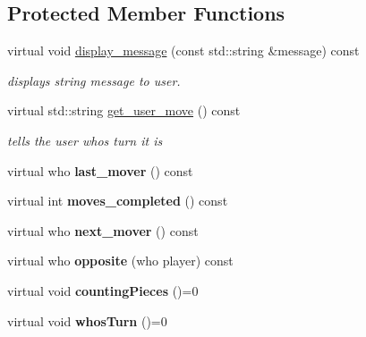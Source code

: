 \subsection*{Protected Member Functions}
\begin{DoxyCompactItemize}
\item 
virtual void \hyperlink{classmain__savitch__14_1_1game_ac58bfc07db8e604b07d2039b2cf7ab51}{display\+\_\+message} (const std\+::string \&message) const
\begin{DoxyCompactList}\small\item\em displays string message to user. \end{DoxyCompactList}\item 
virtual std\+::string \hyperlink{classmain__savitch__14_1_1game_a6504d401fcc8b138ae6342c2868c8a40}{get\+\_\+user\+\_\+move} () const
\begin{DoxyCompactList}\small\item\em tells the user whos turn it is \end{DoxyCompactList}\item 
\mbox{\label{classmain__savitch__14_1_1game_a5c1ab8b36fb977bbe9fe387e793e4ee5}} 
virtual who {\bfseries last\+\_\+mover} () const
\item 
\mbox{\label{classmain__savitch__14_1_1game_a31dd5382cc6d64a6d58bcee55383cf1b}} 
virtual int {\bfseries moves\+\_\+completed} () const
\item 
\mbox{\label{classmain__savitch__14_1_1game_a4e68409618474d19742dd5f75f92f5c9}} 
virtual who {\bfseries next\+\_\+mover} () const
\item 
\mbox{\label{classmain__savitch__14_1_1game_a98469e89e13c73a5ee70407a2164888c}} 
virtual who {\bfseries opposite} (who player) const
\item 
\mbox{\label{classmain__savitch__14_1_1game_a5954eccb6abf1ae900ad853ad2af99fa}} 
virtual void {\bfseries counting\+Pieces} ()=0
\item 
\mbox{\label{classmain__savitch__14_1_1game_a98190a2bf784ce0f20533475754d136d}} 
virtual void {\bfseries whos\+Turn} ()=0
\item 

\end{DoxyCompactItemize}
